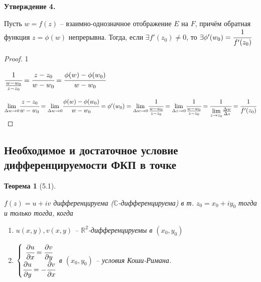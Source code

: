 \documentclass[draft]{report}
\newcommand{\forcenewline}{$\phantom{\mbox{newline}}$\newline}
\newcommand{\dd}{\partial}
\newcommand{\R}{\mathbb{R}}
\renewcommand{\C}{\mathbb{C}}
\newcommand{\mlim}[1]{\underset{#1}{\lim}}
\renewcommand{\f}{\phi}
\newcommand{\D}{\Delta}
\newcommand{\sys}[1]{\left\{\begin{matrix}#1\end{matrix}\right.}
\newtheorem*{theor}{Теорема}
\theoremstyle{remark}
\begin{document}
{\bfseries Утверждение 4.}

Пусть $w=f(z)$ -- взаимно-однозначное отображение $E$ на $F$, причём обратная функция $z=\phi(w)$ непрерывна. Тогда, если $\exists f'(z_0)\neq0$, то $\exists \phi'(w_0)=\cfrac{1}{f'(z_0)}$

\begin{proof}
1\forcenewline

$\cfrac{1}{\frac{w-w_0}{z-z_0}}=\cfrac{z-z_0}{w-w_0}=\cfrac{\f(w)-\f(w_0)}{w-w_0}$

$\mlim{\D w\to 0}\cfrac{z-z_0}{w-w_0}=\mlim{\D w\to0}\cfrac{\f(w)-\f(w_0)}{w-w_0}=\f'(w_0)=\mlim{\D w\to0}\cfrac{1}{\frac{w-w_0}{z-z_0}}=\mlim{\D z\to0}\cfrac{1}{\frac{w-w_0}{z-z_0}}=\cfrac{1}{\mlim{z\to z_0}\frac{\D w}{\D z}}=\cfrac{1}{f'(z_0)}$
\end{proof}

\subsection{Необходимое и достаточное условие дифференцируемости ФКП в точке}

\begin{theor}[5.1]
\forcenewline

$f(z)=u+iv$ дифференцируема ($\C$-дифференцируема) в т. $z_0=x_0+iy_0$ тогда и только тогда, когда \begin{enumerate}
\item $u(x,y),v(x,y)$ -- $\R^2$-дифференцируемы в $(x_0,y_0)$
\item $\sys{\cfrac{\dd u}{\dd x}=\cfrac{\dd v}{\dd y} \\ \cfrac{\dd u}{\dd y}=-\cfrac{\dd v}{\dd x}}$ в $(x_0,y_0)$ -- условия Коши-Римана.
\end{enumerate}
\end{theor}
\end{document}
